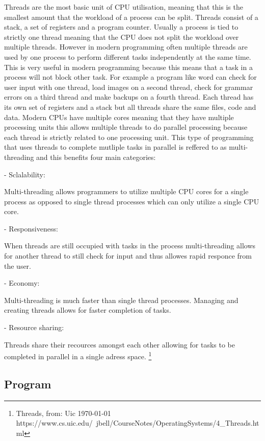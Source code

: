 Threads are the most basic unit of CPU utilisation, meaning that this is the smallest amount that the workload of a 
process can be split. Threads consist of a stack, a set of registers and a program counter. Usually a process
is tied to strictly one thread meaning that the CPU does not split the workload over multiple threads. However in
modern programming often multiple threads are used by one process to perform different tasks independently at the
same time. This is very useful in modern programming because this means that a task in a process will not block 
other task. For example a program like word can check for user input with one thread, load images on a second thread,
check for grammar errors on a third thread and make backups on a fourth thread. Each thread has its own set of registers
and a stack but all threads share the same files, code and data. Modern CPUs have multiple cores meaning that they have
multiple processing units this allows multiple threads to do parallel processing because each thread is strictly
related to one processing unit. This type of programming that uses threads to complete mutliple tasks
in parallel is reffered to as multi-threading and this benefits four main categories:

- Sclalability:

Multi-threading allows programmers to utilize multiple CPU cores for a single process as opposed to single
thread processes which can only utilize a single CPU core.

- Responsiveness:

When threads are still occupied with tasks in the process multi-threading allows for another thread
to still check for input and thus allowes rapid responce from the user.

- Economy:

Multi-threading is much faster than single thread processes. Managing and creating threads allows for
faster completion of tasks.

- Resource sharing:

Threads share their recources amongst each other allowing for tasks to be completed in parallel in a
single adress space. \footnote{Threads, from: Uic \today \\ https://www.cs.uic.edu/~jbell/CourseNotes/OperatingSystems/4_Threads.html }



\subsection{Program}

